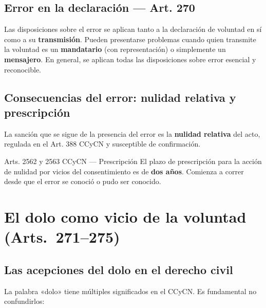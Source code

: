 \documentclass[12pt,oneside]{book}
\begin{document}
\section{Error en la declaración --- Art. 270}

Las disposiciones sobre el error se aplican tanto a la declaración de voluntad en sí como a su \textbf{transmisión}. Pueden presentarse problemas cuando quien transmite la voluntad es un \textbf{mandatario} (con representación) o simplemente un \textbf{mensajero}. En general, se aplican todas las disposiciones sobre error esencial y reconocible.

\section{Consecuencias del error: nulidad relativa y prescripción}

La sanción que se sigue de la presencia del error es la \textbf{nulidad relativa} del acto, regulada en el Art. 388 CCyCN y susceptible de confirmación.

\begin{articulo}{Arts. 2562 y 2563 CCyCN --- Prescripción}
El plazo de prescripción para la acción de nulidad por vicios del consentimiento es de \textbf{dos años}. Comienza a correr desde que el error se conoció o pudo ser conocido.
\end{articulo}

\chapter{El dolo como vicio de la voluntad (Arts.~271--275)}

\section{Las acepciones del dolo en el derecho civil}

La palabra «dolo» tiene múltiples significados en el CCyCN. Es fundamental no confundirlos:
\end{document}
